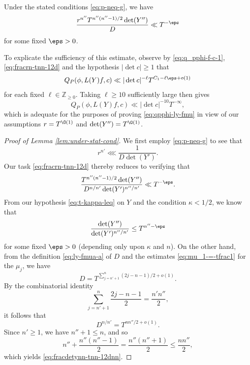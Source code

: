 \begin{lemma}\label{lem:under-stat-cond}
  Under the stated conditions \eqref{eq:p-neq-g}, we have
  \begin{equation}\label{eq:fracrn-tnn-12d}
    \frac{r^{n''} T^{n''(n''-1)/2} \det (Y'')}{D}
    \ll T^{-\eps}
  \end{equation}
  for some fixed $\eps > 0$.
\end{lemma}
To explicate the sufficiency of this estimate, observe by \eqref{eq:q_pphi-f-c-1}, \eqref{eq:fracrn-tnn-12d} and the hypothesis $|\det c| \geq 1$ that
\begin{equation*}
  Q_P(\phi, L(Y) f,c) \ll |\det c|^{-\ell} T^{C_1 - \ell \eps + o(1)}
\end{equation*}
for each fixed $\ell \in \mathbb{Z}_{\geq 0}$.  Taking $\ell \geq 10$ sufficiently large then gives
\begin{equation*}
  Q_P(\phi,L(Y) f,c) \ll |\det c|^{-10} T^{-\infty},
\end{equation*}
which is adequate for the purposes of proving \eqref{eq:qpphi-ly-fmu} in view of our assumptions $r = T^{\O(1)}$ and $\det(Y'') = T^{\O(1)}$.
\begin{proof}[Proof of Lemma \ref{lem:under-stat-cond}]
  We first employ \eqref{eq:p-neq-g} to see that
  \begin{equation*}
    r^{n'} \lll \frac{1}{D \det(Y')}.
  \end{equation*}
  Our task \eqref{eq:fracrn-tnn-12d} thereby reduces to verifying that
  \begin{equation}\label{eq:fracdetynn-tnn-12dnn}
    \frac{T^{n''(n''-1)/2} \det (Y'') }{D^{n/n'} \det(Y')^{n''/n'}  }
    \ll T^{-\eps}.
  \end{equation}
  From our hypothesis \eqref{eq:t-kappa-leq} on $Y$ and the condition $\kappa < 1/2$, we know that
  \begin{equation*}
    \frac{\det(Y'')}{\det(Y')^{n''/n'}} \leq
    T^{n'' - \eps}
  \end{equation*}
  for some fixed $\eps > 0$ (depending only upon $\kappa$ and $n$).  On the other hand, from the definition \eqref{eq:ly-fmua-a} of $D$ and the estimates \eqref{eq:mu_1-=-tfrac1} for the $\mu_j$, we have
  \begin{equation*}
    D = T^{\sum_{j=n'+1}^{n} (2 j - n - 1)/2 + o(1)}.
  \end{equation*}
  By the combinatorial identity
  \begin{equation*}
    \sum_{j=n'+1}^{n}
    \frac{2j -n - 1}{2} =
    \frac{n ' n''}{2},
  \end{equation*}
  it follows that
  \begin{equation*}
    D^{n / n'} =
    T^{n n''/2 + o(1)}.
  \end{equation*}
  Since $n' \geq 1$, we have $n'' + 1 \leq n$, and so
  \begin{equation*}
    n''
    +
    \frac{n'' (n''-1)}{2}
    =
    \frac{n'' (n''+1)}{2}
    \leq
    \frac{n n''}{2},
  \end{equation*}
  which yields \eqref{eq:fracdetynn-tnn-12dnn}.
\end{proof}

